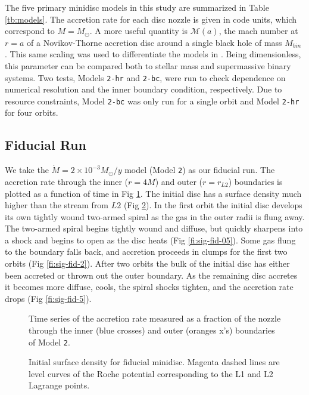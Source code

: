 \documentclass{emulateapj}
\newcommand{\model}[1]{{Model \texttt{#1}}}
\begin{document}
The five primary minidisc models in this study are summarized in Table \ref{tb:models}.  The accretion rate for each disc nozzle is given in code units, which correspond to $M=M_\odot$.  A more useful quantity is $\mathcal{M}(a)$, the mach number at $r=a$ of a Novikov-Thorne accretion disc around a single black hole of mass $M_{bin}$ \citep{Novikov73}.  This same scaling was used to differentiate the models in \cite{Farris14}.  Being dimensionless, this parameter can be compared both to stellar mass and supermassive binary systems.  Two tests, Models \texttt{2-hr} and \texttt{2-bc}, were run to check dependence on numerical resolution and the inner boundary condition, respectively. Due to resource constraints, \model{2-bc} was only run for a single orbit and \model{2-hr} for four orbits.

\subsection{Fiducial Run}
\label{subsec:fiducial}

We take the $\dot{M} = 2 \times 10^{-3} M_\odot / y$ model (\model{2}) as our fiducial run.  The accretion rate through the inner ($r=4 M$) and outer ($r=r_{L2}$) boundaries is plotted as a function of time in Fig \ref{fi:mdot-fid}. The initial disc has a surface density much higher than the stream from $L2$ (Fig \ref{fi:sig-fid-0}).  In the first orbit the initial disc develops its own tightly wound two-armed spiral as the gas in the outer radii is flung away.  The two-armed spiral begins tightly wound and diffuse, but quickly sharpens into a shock and begins to open as the disc heats (Fig \ref{fi:sig-fid-05}).  Some gas flung to the boundary falls back, and accretion proceeds in clumps for the first two orbits (Fig \ref{fi:sig-fid-2}).  After two orbits the bulk of the initial disc has either been accreted or thrown out the outer boundary.  As the remaining disc accretes it becomes more diffuse, cools, the spiral shocks tighten, and the accretion rate drops (Fig \ref{fi:sig-fid-5}).

\begin{figure}
\caption{\label{fi:mdot-fid} Time series of the accretion rate measured as a fraction of the nozzle through the inner (blue crosses) and outer (oranges x's) boundaries of \model{2}.}
\end{figure}

\begin{figure}
\caption{\label{fi:sig-fid-0} Initial surface density for fiducial minidisc.  Magenta dashed lines are level curves of the Roche potential corresponding to the L1 and L2 Lagrange points.}
\end{figure}
\end{document}
